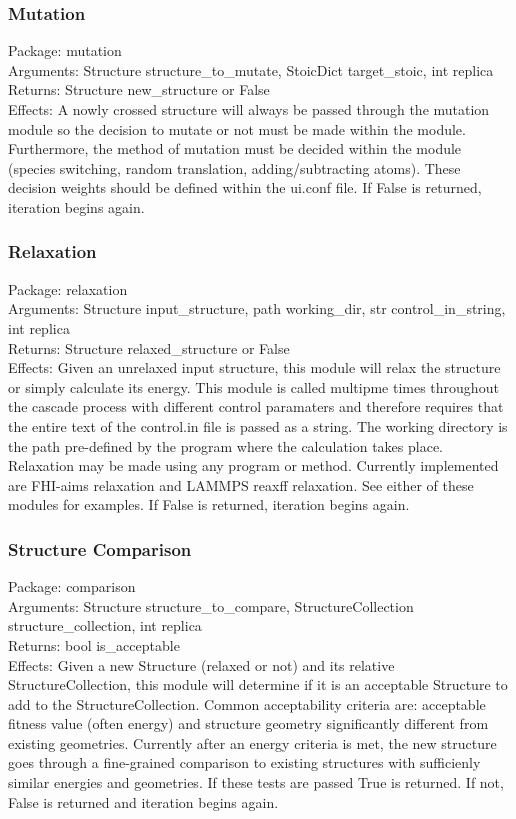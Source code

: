 		\subsubsection{Mutation} \vspace{-\baselineskip}
		Package: mutation\\
		Arguments: Structure structure\_to\_mutate, StoicDict target\_stoic, int replica\\
		Returns: Structure new\_structure or False\\
		Effects: A nowly crossed structure will always be passed through the mutation module so the decision to mutate or not must be made within the module. Furthermore, the method of mutation must be decided within the module (species switching, random translation, adding/subtracting atoms). These decision weights should be defined within the ui.conf file. If False is returned, iteration begins again.

		\subsubsection{Relaxation} \vspace{-\baselineskip}
		Package: relaxation\\
		Arguments: Structure input\_structure, path working\_dir, str control\_in\_string, int replica\\
		Returns: Structure relaxed\_structure or False\\
		Effects: Given an unrelaxed input structure, this module will relax the structure or simply calculate its energy. This module is called multipme times throughout the cascade process with different control paramaters and therefore requires that the entire text of the control.in file is passed as a string. The working directory is the path pre-defined by the program where the calculation takes place. Relaxation may be made using any program or method. Currently implemented are FHI-aims relaxation and LAMMPS reaxff relaxation. See either of these modules for examples. If False is returned, iteration begins again.

		\subsubsection{Structure Comparison} \vspace{-\baselineskip}
		Package: comparison\\
		Arguments: Structure structure\_to\_compare, StructureCollection structure\_collection, int replica\\
		Returns: bool is\_acceptable\\
		Effects: Given a new Structure (relaxed or not) and its relative StructureCollection, this module will determine if it is an acceptable Structure to add to the StructureCollection. Common acceptability criteria are: acceptable fitness value (often energy) and structure geometry significantly different from existing geometries. Currently after an energy criteria is met, the new structure goes through a fine-grained comparison to existing structures with sufficienly similar energies and geometries. If these tests are passed True is returned. If not, False is returned and iteration begins again.

